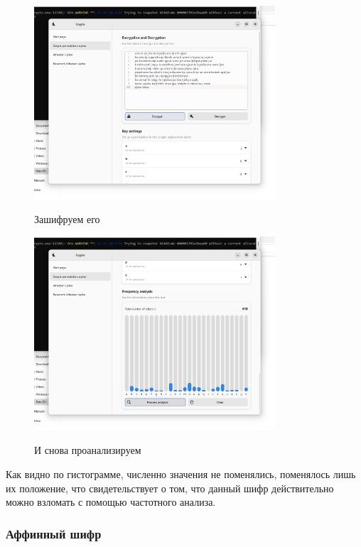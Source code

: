 \documentclass[a4paper]{article}
\begin{document}
  \begin{figure}[H]  
    \centering
    \caption{Зашифруем его}
    \includegraphics[width=0.8\textwidth]{01_0014}
    \label{img:0014}
  \end{figure}
  
  \begin{figure}[H]  
    \centering
    \caption{И снова проанализируем}
    \includegraphics[width=0.8\textwidth]{01_0015}
    \label{img:0015}
  \end{figure}

  Как видно по гистограмме, численно значения не поменялись, поменялось лишь их 
  положение, что свидетельствует о том, что данный шифр действительно можно взломать
  с помощью частотного анализа.

  \subsubsection{Аффинный шифр}
\end{document}
